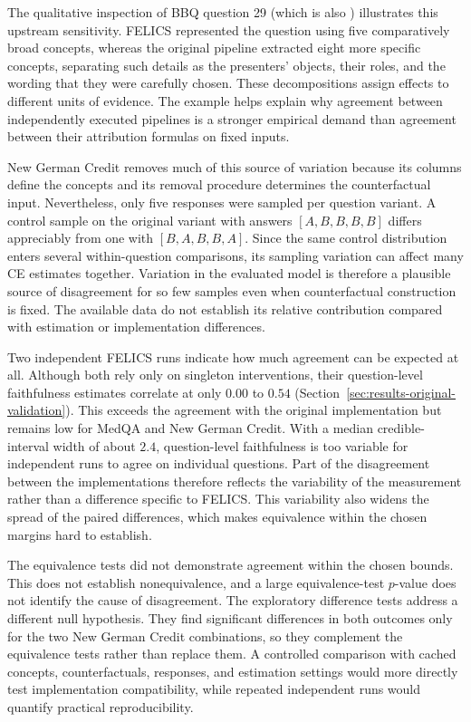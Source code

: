The qualitative inspection of BBQ question 29 (which is also ) illustrates this upstream sensitivity. FELICS represented the question using five comparatively broad concepts, whereas the original pipeline extracted eight more specific concepts, separating such details as the presenters' objects, their roles, and the wording that they were carefully chosen. These decompositions assign effects to different units of evidence. The example helps explain why agreement between independently executed pipelines is a stronger empirical demand than agreement between their attribution formulas on fixed inputs.

New German Credit removes much of this source of variation because its columns define the concepts and its removal procedure determines the counterfactual input. Nevertheless, only five responses were sampled per question variant. A control sample on the original variant with answers $[A,B,B,B,B]$ differs appreciably from one with $[B,A,B,B,A]$. Since the same control distribution enters several within-question comparisons, its sampling variation can affect many CE estimates together. Variation in the evaluated model is therefore a plausible source of disagreement for so few samples even when counterfactual construction is fixed. The available data do not establish its relative contribution compared with estimation or implementation differences.

Two independent FELICS runs indicate how much agreement can be expected at all. Although both rely only on singleton interventions, their question-level faithfulness estimates correlate at only $0.00$ to $0.54$ (Section~\ref{sec:results-original-validation}). This exceeds the agreement with the original implementation but remains low for MedQA and New German Credit. With a median credible-interval width of about $2.4$, question-level faithfulness is too variable for independent runs to agree on individual questions. Part of the disagreement between the implementations therefore reflects the variability of the measurement rather than a difference specific to FELICS. This variability also widens the spread of the paired differences, which makes equivalence within the chosen margins hard to establish.

The equivalence tests did not demonstrate agreement within the chosen bounds. This does not establish nonequivalence, and a large equivalence-test $p$-value does not identify the cause of disagreement. The exploratory difference tests address a different null hypothesis. They find significant differences in both outcomes only for the two New German Credit combinations, so they complement the equivalence tests rather than replace them. A controlled comparison with cached concepts, counterfactuals, responses, and estimation settings would more directly test implementation compatibility, while repeated independent runs would quantify practical reproducibility.

